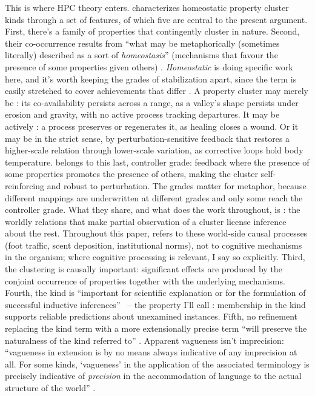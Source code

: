 \documentclass[12pt]{article}
\begin{document}
This is where HPC theory enters. \textcite[526--527]{boyd1993metaphor} characterizes homeostatic property cluster kinds through a set of features, of which five are central to the present argument. First, there's a family of properties that contingently cluster in nature. Second, their co-occurrence results from \enquote{what may be metaphorically (sometimes literally) described as a sort of \emph{homeostasis}} (mechanisms that favour the presence of some properties given others) \citep[526]{boyd1993metaphor}. \emph{Homeostatic} is doing specific work here, and it's worth keeping the grades of stabilization apart, since the term is easily stretched to cover achievements that differ \citep{reynolds2026kindsProjectibilityProfiles, reynolds2026notEveryStableCluster}. A property cluster may merely be : its co-availability persists across a range, as a valley's shape persists under erosion and gravity, with no active process tracking departures. It may be actively : a process preserves or regenerates it, as healing closes a wound. Or it may be  in the strict sense, by perturbation-sensitive feedback that restores a higher-scale relation through lower-scale variation, as corrective loops hold body temperature.  belongs to this last, controller grade: feedback where the presence of some properties promotes the presence of others, making the cluster self-reinforcing and robust to perturbation. The grades matter for metaphor, because different mappings are underwritten at different grades and only some reach the controller grade. What they share, and what does the work throughout, is : the worldly relations that make partial observation of a cluster license inference about the rest. Throughout this paper,  refers to these world-side causal processes (foot traffic, scent deposition, institutional norms), not to cognitive mechanisms in the organism; where cognitive processing is relevant, I say so explicitly. Third, the clustering is causally important: significant effects are produced by the conjoint occurrence of properties together with the underlying mechanisms. Fourth, the kind is \enquote{important for scientific explanation or for the formulation of successful inductive inferences} \citep[526]{boyd1993metaphor}~-- the property I'll call : membership in the kind supports reliable predictions about unexamined instances. Fifth, no refinement replacing the kind term with a more extensionally precise term \enquote{will preserve the naturalness of the kind referred to} \citep[527]{boyd1993metaphor}. Apparent vagueness isn't imprecision: \enquote{vagueness in extension is by no means always indicative of any imprecision at all. For some kinds, `vagueness' in the application of the associated terminology is precisely indicative of \emph{precision} in the accommodation of language to the actual structure of the world} \citep[530]{boyd1993metaphor}.
\end{document}

